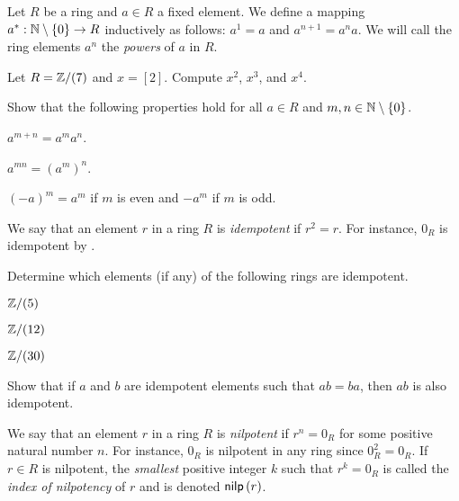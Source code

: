 \begin{dfn} \label{dfn:pow-elt}
Let \(R\) be a ring and \(a \in R\) a fixed element.
We define a mapping \(a^\ast : \mathbb{N} \setminus \{0\} \rightarrow R\) inductively as follows: \(a^1 = a\) and \(a^{n+1} = a^n a\).
We will call the ring elements \(a^n\) the \emph{powers} of \(a\) in \(R\).
\end{dfn}

\begin{exercise}
Let \(R = \mathbb{Z}/(7)\) and \(x = [2]\).
Compute \(x^2\), \(x^3\), and \(x^4\).
\end{exercise}

\begin{exercise} \label{exerc:ring-powers}
Show that the following properties hold for all \(a \in R\) and \(m,n \in \mathbb{N} \setminus \{0\}\).
\begin{proplist*}
\item \(a^{m+n} = a^m a^n\).
\item \(a^{mn} = (a^m)^n\).
\item \((-a)^m = a^m\) if \(m\) is even and \(-a^m\) if \(m\) is odd.
\end{proplist*}
\end{exercise}

\begin{dfn}[Idempotent] \label{dfn:idempotent}
We say that an element \(r\) in a ring \(R\) is \emph{idempotent} if \(r^2 = r\).
For instance, \(0_R\) is idempotent by .
\end{dfn}

\begin{exercise}
Determine which elements (if any) of the following rings are idempotent.
\begin{proplist*}
\item \(\mathbb{Z}/(5)\)
\item \(\mathbb{Z}/(12)\)
\item \(\mathbb{Z}/(30)\)
\end{proplist*}
\end{exercise}

\begin{exercise}
Show that if \(a\) and \(b\) are idempotent elements such that \(ab = ba\), then \(ab\) is also idempotent.
\end{exercise}

\begin{dfn}[Nilpotent] \label{dfn:nilpotent}
We say that an element \(r\) in a ring \(R\) is \emph{nilpotent} if \(r^n = 0_R\) for some positive natural number \(n\).
For instance, \(0_R\) is nilpotent in any ring since \(0_R^2 = 0_R\).
If \(r \in R\) is nilpotent, the \emph{smallest} positive integer \(k\) such that \(r^k = 0_R\) is called the \emph{index of nilpotency} of \(r\) and is denoted \(\mathsf{nilp}\left(r\right)\).
\end{dfn}

